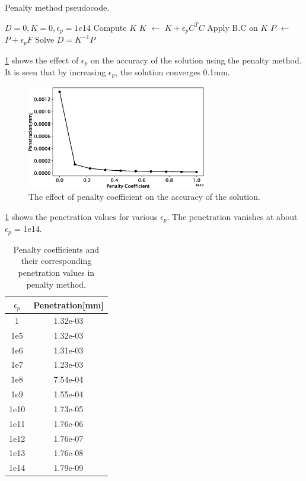 \documentclass{article}
\begin{document}
\begin{algorithm}[H]
\caption{Penalty method pseudocode.}
\begin{algorithmic} 
\ENSURE $D = 0, K = 0, \epsilon_p = 1e14$
\STATE Compute $K$
\STATE $K$ $\leftarrow$ $K + \epsilon_p C^{T} C$
\STATE Apply B.C on $K$
\STATE $P$ $\leftarrow$ $P + \epsilon_p F$
\STATE Solve $D = K^{-1} P$
\end{algorithmic}
\label{alg:pm}
\end{algorithm}

\cref{fig:pm_study} shows the effect of $\epsilon_p$ on the accuracy of the solution using the penalty method. It is seen that by increasing $\epsilon_p$, the solution converges 0.1mm.

\begin{figure}[H]
    \centering
    \includegraphics[width = 0.7\textwidth ]{figures/penalty.eps}
    \caption{The effect of penalty coefficient on the accuracy of the solution.}
    \label{fig:pm_study}
\end{figure}

\cref{tab:pm} shows the penetration values for various $\epsilon_p$. The penetration vanishes at about $\epsilon_p$ = 1e14. 

\begin{table}[H]
    \centering
    \caption{Penalty coefficients and their corresponding penetration values in penalty method.}
    \begin{tabular}{cc} \hline
    $\epsilon_p$ & Penetration[mm] \\ \hline
        1 & 1.32e-03 \\
        1e5 & 1.32e-03 \\
        1e6 & 1.31e-03 \\
        1e7 & 1.23e-03 \\
        1e8 & 7.54e-04 \\
        1e9 & 1.55e-04 \\
        1e10 & 1.73e-05\\
        1e11 & 1.76e-06\\
        1e12 & 1.76e-07\\
        1e13 & 1.76e-08\\
        1e14 & 1.79e-09\\ \hline
    \end{tabular}
    \label{tab:pm}
\end{table}
\end{document}
